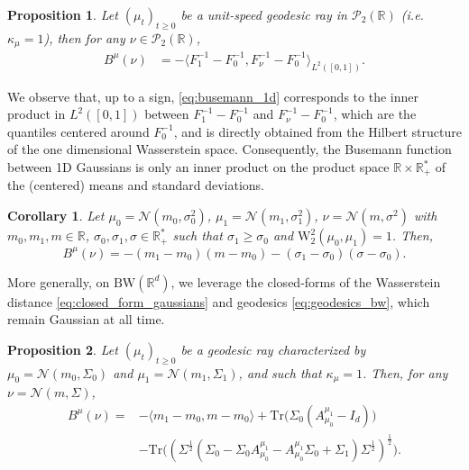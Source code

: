 \documentclass[twoside]{article}
\newtheorem{proposition}{Proposition}
\newtheorem{corollary}{Corollary}
\newcommand{\cP}{\mathcal{P}}
\newcommand{\cN}{\mathcal{N}}
\newcommand{\W}{\mathrm{W}}
\newcommand{\R}{\mathbb{R}}
\newcommand{\tr}{\mathrm{Tr}}
\newcommand{\bw}{\mathrm{BW}}
\def\mo{m_{0}}
\def\m1{m_{1}}
\def\so{\sigma_{0}}
\def\s1{\sigma_{1}}
\def\So{\Sigma_{0}}
\def\S1{\Sigma_{1}}
\begin{document}
\begin{proposition} \label{prop:busemann_closed_1d}
    Let $(\mu_t)_{t\ge 0}$ be a unit-speed geodesic ray in $\cP_2(\R)$ (\emph{i.e.} $\kappa_\mu=1$), then for any $\nu\in\cP_2(\R)$,
    \begin{equation} \label{eq:busemann_1d}
        \begin{aligned}
            B^\mu(\nu) %
            &= -\langle F_1^{-1} - F_0^{-1}, F_\nu^{-1}-F_0^{-1}\rangle_{L^2([0,1])}.
        \end{aligned}
    \end{equation}
\end{proposition}

We observe that, up to a sign, \eqref{eq:busemann_1d} corresponds  to the inner product in $L^2([0,1])$ between $F_{1}^{-1}-F_{0}^{-1}$ and $F_{\nu}^{-1} - F_{0}^{-1}$, which are the quantiles centered around $F_{0}^{-1}$, and is directly obtained from the Hilbert structure of the one dimensional Wasserstein space. Consequently, the Busemann function between 1D Gaussians is only an inner product on the product space $\R\times \R_+^*$ of the (centered) means and standard deviations.

\begin{corollary} \label{corr:busemann_1d_gaussian}
    Let $\mu_0=\cN(\mo,\so^2)$, $\mu_1=\cN(\m1,\s1^2)$, $\nu=\cN(m,\sigma^2)$ with $m_0,m_1,m\in \R$, $\sigma_0,\sigma_1,\sigma\in \R_+^*$ such that $\sigma_1\ge \sigma_0$ and $\W_2^2(\mu_0,\mu_1)=1$. Then, 
    \begin{equation} \label{eq:1d_busemann_gaussian}
        B^\mu(\nu) = - (\m1-\mo)(m-\mo) - (\s1-\so)(\sigma-\so). %
    \end{equation}
\end{corollary}

 More generally, on $\bw(\R^d)$, %
we leverage the closed-forms of the Wasserstein distance  \eqref{eq:closed_form_gaussians} and geodesics \eqref{eq:geodesics_bw}, which remain Gaussian at all time. %

\begin{proposition} \label{prop:closed_form_general_gaussian}
    Let $(\mu_t)_{t\ge 0}$ be a geodesic ray characterized by $\mu_0 = \mathcal{N}(\mo, \So)$ and $\mu_1 = \mathcal{N}(\m1, \S1)$, and such that $\kappa_\mu=1$. 
    Then, for any $\nu=\mathcal{N}(m,\Sigma)$,
    \begin{equation}\label{eq:busemann_gaussians}
        \begin{aligned}
          B^\mu(\nu) = &-\langle \m1-\mo, m-\mo\rangle + \tr\big(\So(A_{\mu_0}^{\mu_1}-I_d)\big) \\
            &- \tr\big((\Sigma^\frac12(\So-\So A_{\mu_0}^{\mu_1} - A_{\mu_0}^{\mu_1}\So + \S1)\Sigma^\frac12)^\frac12\big).
        \end{aligned}
    \end{equation}\noindent
\end{proposition}
\end{document}
